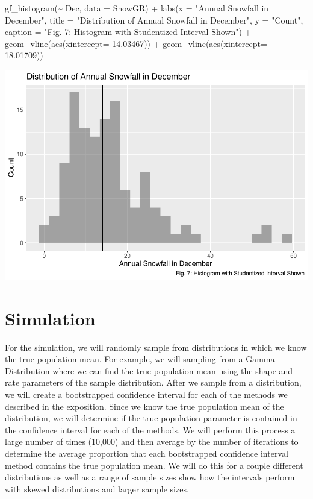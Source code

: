 \documentclass[12pt]{article}
\newenvironment{Shaded}{\begin{snugshade}}{\end{snugshade}}
\newcommand{\AttributeTok}[1]{\textcolor[rgb]{0.77,0.63,0.00}{#1}}
\newcommand{\FloatTok}[1]{\textcolor[rgb]{0.00,0.00,0.81}{#1}}
\newcommand{\FunctionTok}[1]{\textcolor[rgb]{0.00,0.00,0.00}{#1}}
\newcommand{\NormalTok}[1]{#1}
\newcommand{\SpecialCharTok}[1]{\textcolor[rgb]{0.00,0.00,0.00}{#1}}
\newcommand{\StringTok}[1]{\textcolor[rgb]{0.31,0.60,0.02}{#1}}
\begin{document}
\begin{Shaded}
\begin{Highlighting}[]
\FunctionTok{gf\_histogram}\NormalTok{(}\SpecialCharTok{\textasciitilde{}}\NormalTok{ Dec, }\AttributeTok{data =}\NormalTok{ SnowGR) }\SpecialCharTok{+}
  \FunctionTok{labs}\NormalTok{(}\AttributeTok{x =} \StringTok{"Annual Snowfall in December"}\NormalTok{, }
       \AttributeTok{title =} \StringTok{"Distribution of Annual Snowfall in December"}\NormalTok{, }\AttributeTok{y =} \StringTok{"Count"}\NormalTok{, }
       \AttributeTok{caption =} \StringTok{"Fig. 7: Histogram with Studentized Interval Shown"}\NormalTok{) }\SpecialCharTok{+}
  \FunctionTok{geom\_vline}\NormalTok{(}\FunctionTok{aes}\NormalTok{(}\AttributeTok{xintercept=} \FloatTok{14.03467}\NormalTok{)) }\SpecialCharTok{+}
  \FunctionTok{geom\_vline}\NormalTok{(}\FunctionTok{aes}\NormalTok{(}\AttributeTok{xintercept=} \FloatTok{18.01709}\NormalTok{)) }
\end{Highlighting}
\end{Shaded}

\includegraphics{paper_files/figure-latex/unnamed-chunk-19-1.pdf}

\hypertarget{simulation}{%
\section{Simulation}\label{simulation}}

For the simulation, we will randomly sample from distributions in which
we know the true population mean. For example, we will sampling from a
Gamma Distribution where we can find the true population mean using the
shape and rate parameters of the sample distribution. After we sample
from a distribution, we will create a bootstrapped confidence interval
for each of the methods we described in the exposition. Since we know
the true population mean of the distribution, we will determine if the
true population parameter is contained in the confidence interval for
each of the methods. We will perform this process a large number of
times (10,000) and then average by the number of iterations to determine
the average proportion that each bootstrapped confidence interval method
contains the true population mean. We will do this for a couple
different distributions as well as a range of sample sizes show how the
intervals perform with skewed distributions and larger sample sizes.
\end{document}

